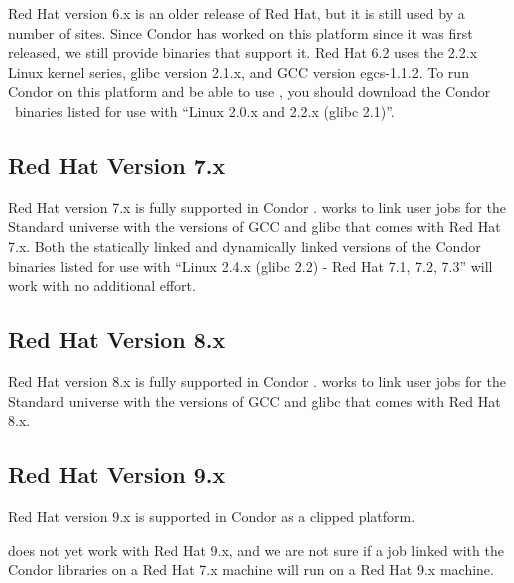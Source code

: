 Red Hat version 6.x is an older release of Red Hat, but it is still used
by a number of sites.
Since Condor has worked on this platform since it was first released,
we still provide binaries that support it.
Red Hat 6.2 uses the 2.2.x Linux kernel series, glibc version 2.1.x,
and GCC version egcs-1.1.2.
To run Condor on this platform and be able to use ,
you should download the Condor \VersionNotice\  binaries listed for use
with ``Linux 2.0.x and 2.2.x (glibc 2.1)''.


\subsection{\label{sec:platform-linux-rh7}Red Hat Version 7.x}

Red Hat version 7.x is fully supported in Condor \VersionNotice.
 works to link user jobs for the Standard universe
with the versions of GCC and glibc that comes with Red Hat 7.x.
Both the statically linked and dynamically linked versions of the
Condor binaries listed for use with ``Linux 2.4.x (glibc 2.2) - Red Hat
7.1, 7.2, 7.3'' will work with no additional effort.


\subsection{\label{sec:platform-linux-rh8}Red Hat Version 8.x}

Red Hat version 8.x is fully supported in Condor \VersionNotice.
 works to link user jobs for the Standard universe
with the versions of GCC and glibc that comes with Red Hat 8.x.

\subsection{\label{sec:platform-linux-rh9}Red Hat Version 9.x}

Red Hat version 9.x is supported in Condor \VersionNotice as a clipped 
platform.

 does not yet work with Red Hat 9.x, and we are not
sure if a job linked with the Condor libraries on a Red Hat 7.x machine
will run on a Red Hat 9.x machine.  
